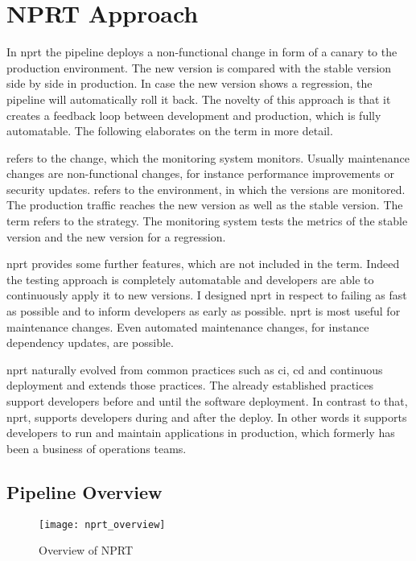\chapter{NPRT Approach}
\label{chap:macro}

In \gls{nprt} the pipeline deploys a non-functional change in form of a canary to the
production environment. The new version is compared with the stable version side by side
in production. In case the new version shows a regression, the pipeline will automatically
roll it back. The novelty of this approach is that it creates a feedback loop between
development and production, which is fully automatable. The following elaborates on the
term in more detail.

 refers to the change, which the monitoring system
monitors. Usually maintenance changes are non-functional changes, for instance performance
improvements or security updates.  refers to the environment, in which
the versions are monitored. The production traffic reaches the new version as well as the
stable version. The term  refers to the  strategy. The
monitoring system tests the metrics of the stable version and the new version for a
regression.

\gls{nprt} provides some further features, which are not included in the term. Indeed the
testing approach is completely automatable and developers are able to continuously apply
it to new versions. I designed \gls{nprt} in respect to failing as fast as possible and to
inform developers as early as possible. \gls{nprt} is most useful for maintenance
changes. Even automated maintenance changes, for instance dependency updates, are
possible.

\gls{nprt} naturally evolved from common practices such as \gls{ci}, \gls{cd} and
continuous deployment and extends those practices. The already established practices
support developers before and until the software deployment. In contrast to that,
\gls{nprt}, supports developers during and after the deploy. In other words it supports
developers to run and maintain applications in production, which formerly has been a
business of operations teams.

\section{Pipeline Overview}

\begin{figure}[htbp]
  \texttt{[image: nprt\_overview]}
  \caption{Overview of NPRT}
  \label{fig:nprt_flow}
\end{figure}

